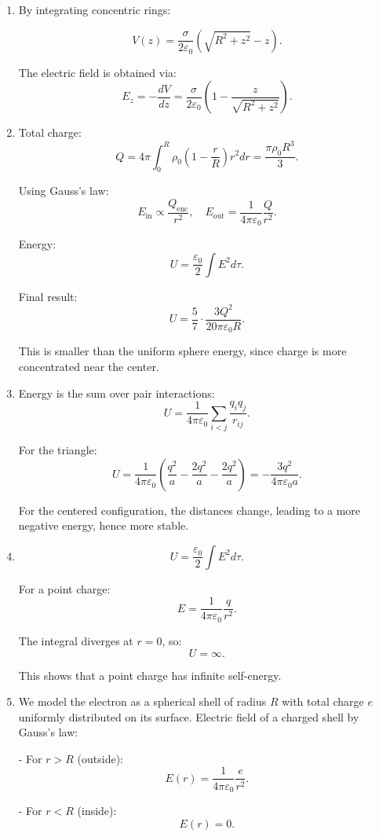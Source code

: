 \documentclass[12pt]{article}
\begin{document}
\begin{enumerate}
\item By integrating concentric rings:

\[
V(z) = \frac{\sigma}{2\varepsilon_0}\left(\sqrt{R^2 + z^2} - z\right).
\]

The electric field is obtained via:
\[
E_z = -\frac{dV}{dz} = \frac{\sigma}{2\varepsilon_0}\left(1 - \frac{z}{\sqrt{R^2+z^2}}\right).
\]

\item Total charge:
\[
Q = 4\pi \int_0^R \rho_0\left(1 - \frac{r}{R}\right) r^2 dr = \frac{\pi \rho_0 R^3}{3}.
\]

Using Gauss’s law:
\[
E_{\text{in}} \propto \frac{Q_{\text{enc}}}{r^2}, \quad
E_{\text{out}} = \frac{1}{4\pi\varepsilon_0}\frac{Q}{r^2}.
\]

Energy:
\[
U = \frac{\varepsilon_0}{2}\int E^2 d\tau.
\]

Final result:
\[
U = \frac{5}{7} \cdot \frac{3Q^2}{20\pi\varepsilon_0 R}.
\]

This is smaller than the uniform sphere energy, since charge is more concentrated near the center.

\item Energy is the sum over pair interactions:
\[
U = \frac{1}{4\pi\varepsilon_0}\sum_{i<j} \frac{q_i q_j}{r_{ij}}.
\]

For the triangle:
\[
U = \frac{1}{4\pi\varepsilon_0}\left(\frac{q^2}{a} - \frac{2q^2}{a} - \frac{2q^2}{a}\right)
= -\frac{3q^2}{4\pi\varepsilon_0 a}.
\]

For the centered configuration, the distances change, leading to a more negative energy, hence more stable.

\item 

\[
U = \frac{\varepsilon_0}{2} \int E^2 d\tau.
\]

For a point charge:
\[
E = \frac{1}{4\pi\varepsilon_0}\frac{q}{r^2}.
\]

The integral diverges at $r=0$, so:
\[
U = \infty.
\]

This shows that a point charge has infinite self-energy.

\item We model the electron as a spherical shell of radius $R$ with total charge $e$ uniformly distributed on its surface. Electric field of a charged shell by Gauss’s law:

- For $r > R$ (outside):
\[
E(r) = \frac{1}{4\pi \varepsilon_0} \frac{e}{r^2}.
\]

- For $r < R$ (inside):
\[
E(r) = 0.
\]


\end{enumerate}
\end{document}
